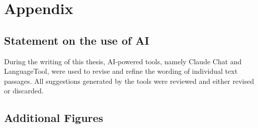 \chapter*{Appendix}

\section{Statement on the use of AI}

During the writing of this thesis, AI-powered tools, namely Claude Chat and LanguageTool, were used to revise and refine the wording of individual text passages. All suggestions generated by the tools were reviewed and either revised or discarded.

\section{Additional Figures}
\label{sec:appendix}

\renewcommand{\topfraction}{0.98}
\renewcommand{\floatpagefraction}{0.9}
\setcounter{topnumber}{2}

